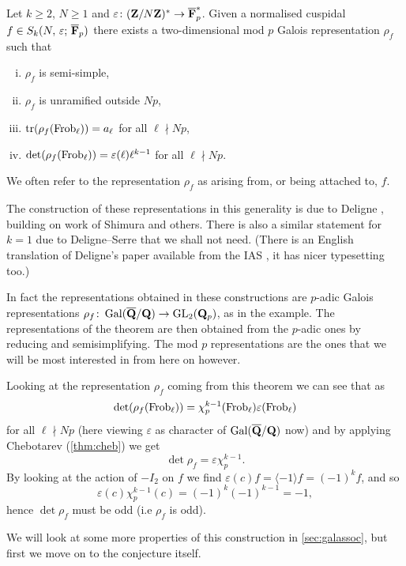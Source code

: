 \documentclass[a4paper,12pt]{article}
\begin{document}
\begin{thm}[Deligne]\label{thm:assoc}
Let $k \ge 2$, $N \ge 1$ and $\varepsilon\colon (\mathbf{Z}/N\mathbf{Z})^* \to \overline{\mathbf{F}}_p^*$. Given a normalised cuspidal $f\in S_k(N,\,\varepsilon;\,\overline{\mathbf{F}}_p)$ there exists a two-dimensional mod $p$ Galois representation $\rho_f$ such that
\begin{enumerate}[(i)]
\item $\rho_f$ is semi-simple,
\item $\rho_f$ is unramified outside $Np$,
\item $\operatorname{tr}(\rho_f (\operatorname{Frob}_\ell)) = a_\ell$ for all $\ell \nmid Np$,
\item $\det(\rho_f (\operatorname{Frob}_\ell)) = \varepsilon(\ell)\ell^{k-1}$ for all $\ell \nmid Np$. %
\end{enumerate}
We often refer to the representation $\rho_f$ as arising from, or being attached to, $f$.
\end{thm}

The construction of these representations in this generality is due to Deligne \cite{Deligne}, building on work of Shimura and others.
There is also a similar statement for $k = 1$ due to Deligne--Serre \cite{DeligneSerre} that we shall not need.
(There is an English translation of Deligne's paper available from the IAS \cite{DeligneEng}, it has nicer typesetting too.)

In fact the representations obtained in these constructions are $p$-adic Galois representations $\rho_f\colon \operatorname{Gal}(\overline{\mathbf{Q}}/\mathbf{Q}) \to \operatorname{GL}_2(\mathbf{Q}_p)$, as in the example.
The representations of the theorem are then obtained from the $p$-adic ones by reducing and semisimplifying.
The mod $p$ representations are the ones that we will be most interested in from here on however.

\begin{rmk}\label{rmk:detrho}
Looking at the representation $\rho_f$ coming from this theorem we can see that as
\[
\det(\rho_f(\operatorname{Frob}_\ell)) = \chi_p^{k-1}(\operatorname{Frob}_\ell)\varepsilon(\operatorname{Frob}_\ell)
\]
for all $\ell \nmid Np$ (here viewing $\varepsilon$ as character of $\operatorname{Gal}(\overline{\mathbf{Q}}/\mathbf{Q})$ now) and by applying Chebotarev (\cref{thm:cheb}) we get
\[
\det\rho_f = \varepsilon\chi_p^{k-1}.
\]
By looking at the action of $-I_2$ on $f$ we find $\varepsilon(c)f = \langle -1 \rangle f = (-1)^k f$, and so
\[
\varepsilon(c)\chi_p^{k-1}(c) = (-1)^k(-1)^{k-1} = -1,
\]
hence $\det\rho_f$ must be odd (i.e $\rho_f$ is odd).
\end{rmk}

We will look at some more properties of this construction in \cref{sec:galassoc}, but first we move on to the conjecture itself.
\end{document}

